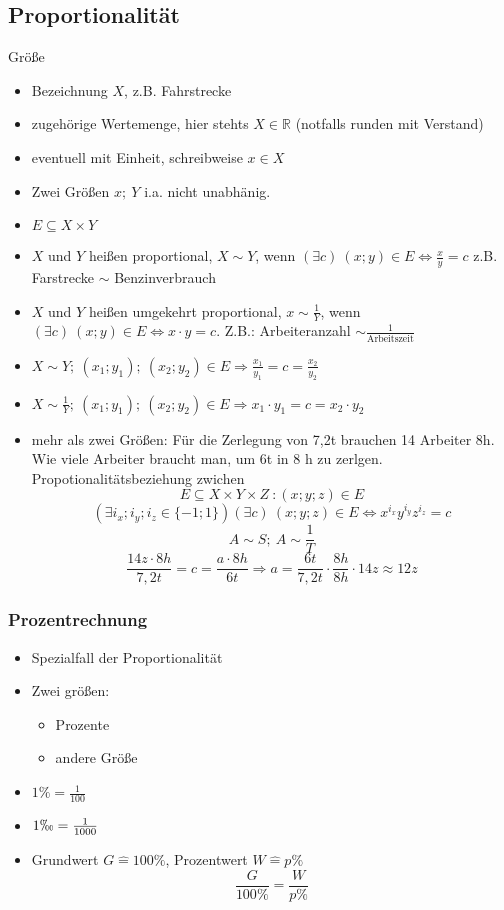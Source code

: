\documentclass[12pt,a4paper]{article}
\begin{document}
\subsection{Proportionalität}
Größe
\begin{itemize}
	\item Bezeichnung $X$, z.B. Fahrstrecke
	\item zugehörige Wertemenge, hier stehts $X\in \mathbb{R}$ (notfalls runden mit Verstand)
	\item eventuell mit Einheit, schreibweise $x \in X$
	\item Zwei Größen $x;\ Y$ i.a. nicht unabhänig.
	\item $E \subseteq X \times Y$
	\item $X$ und $Y$ heißen proportional, $X \sim Y$, wenn $(\exists c)\ (x;y) \in E \Leftrightarrow \frac{x}{y}=c$ z.B. Farstrecke $\sim$ Benzinverbrauch
	\item $X$ und $Y$ heißen umgekehrt proportional, $x \sim \frac{1}{Y}$, wenn $(\exists c)\ (x;y) \in E \Leftrightarrow x \cdot y = c$. Z.B.: Arbeiteranzahl $\sim \frac{1}{\textrm{Arbeitszeit}}$
	\item $X \sim Y;\ (x_1;y_1);\ (x_2;y_2) \in E \Rightarrow \frac{x_1}{y_1} = c = \frac{x_2}{y_2}$
	\item $X \sim \frac{1}{Y};\ (x_1;y_1);\ (x_2;y_2) \in E \Rightarrow x_1 \cdot y_1 = c = x_2 \cdot y_2$
	\item mehr als zwei Größen: Für die Zerlegung von 7,2t brauchen 14 Arbeiter 8h. Wie viele Arbeiter braucht man, um 6t in 8 h zu zerlgen. \\
	      Propotionalitätsbeziehung zwichen $$E \subseteq X \times  Y \times Z\ : (x; y; z) \in E$$ $$(\exists i_x; i_y; i_z \in \lbrace -1; 1 \rbrace) (\exists c)\ (x;y;z) \in E \Leftrightarrow x^{i_x}y^{i_y}z^{i_z} = c$$
	      $$A \sim S;\ A \sim \frac{1}{T}$$
	      $$\frac{14z \cdot 8h}{7{,}2t}=c=\frac{a \cdot 8h}{6t} \Rightarrow a = \frac{6t}{7{,}2t}\cdot \frac{8h}{8h} \cdot 14z \approx 12z$$
\end{itemize}
\subsubsection{Prozentrechnung}
\begin{itemize}
	\item Spezialfall der Proportionalität
	\item Zwei größen:\
	      \begin{itemize}
		      \item Prozente
		      \item andere Größe
	      \end{itemize}
	\item $1\% = \frac{1}{100}$
	\item $1\permil = \frac{1}{1000}$
	\item Grundwert $G \hat{=} 100\%$, Prozentwert $W \hat{=} p\%$
	      $$\frac{G}{100\%} = \frac{W}{p\%}$$
\end{itemize}
\end{document}
